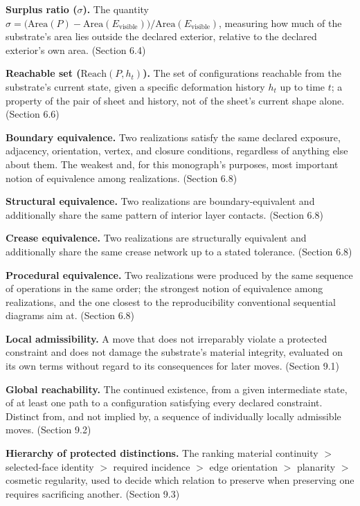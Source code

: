 \documentclass[11pt,oneside]{book}
\begin{document}
\textbf{Surplus ratio (\(\sigma\)).} The quantity
\(\sigma = \big(\text{Area}(P) - \text{Area}(E_{\text{visible}})\big) / \text{Area}(E_{\text{visible}})\),
measuring how much of the substrate's area lies outside the declared
exterior, relative to the declared exterior's own area. (Section 6.4)

\textbf{Reachable set (\(\text{Reach}(P, h_t)\)).} The set of
configurations reachable from the substrate's current state, given a
specific deformation history \(h_t\) up to time \(t\); a property of the
pair of sheet and history, not of the sheet's current shape alone.
(Section 6.6)

\textbf{Boundary equivalence.} Two realizations satisfy the same
declared exposure, adjacency, orientation, vertex, and closure
conditions, regardless of anything else about them. The weakest and, for
this monograph's purposes, most important notion of equivalence among
realizations. (Section 6.8)

\textbf{Structural equivalence.} Two realizations are
boundary-equivalent and additionally share the same pattern of interior
layer contacts. (Section 6.8)

\textbf{Crease equivalence.} Two realizations are structurally
equivalent and additionally share the same crease network up to a stated
tolerance. (Section 6.8)

\textbf{Procedural equivalence.} Two realizations were produced by the
same sequence of operations in the same order; the strongest notion of
equivalence among realizations, and the one closest to the
reproducibility conventional sequential diagrams aim at. (Section 6.8)

\textbf{Local admissibility.} A move that does not irreparably violate a
protected constraint and does not damage the substrate's material
integrity, evaluated on its own terms without regard to its consequences
for later moves. (Section 9.1)

\textbf{Global reachability.} The continued existence, from a given
intermediate state, of at least one path to a configuration satisfying
every declared constraint. Distinct from, and not implied by, a sequence
of individually locally admissible moves. (Section 9.2)

\textbf{Hierarchy of protected distinctions.} The ranking material
continuity \(>\) selected-face identity \(>\) required incidence \(>\)
edge orientation \(>\) planarity \(>\) cosmetic regularity, used to
decide which relation to preserve when preserving one requires
sacrificing another. (Section 9.3)
\end{document}
